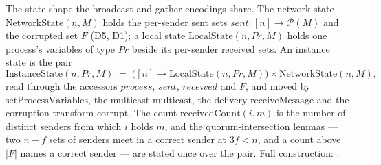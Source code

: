 \begin{definition}
  \label{def:aba-networkstate}
  \leanok
  The state shape the broadcast and gather encodings share.
  The network state $\mathrm{NetworkState}(n, M)$ holds the per-sender sent sets $sent : [n] \to \mathcal{P}(M)$ and the corrupted set $F$ (D5, D1); a local state $\mathrm{LocalState}(n, Pr, M)$ holds one process's variables of type $Pr$ beside its per-sender received sets.
  An instance state is the pair
  \[
    \mathrm{InstanceState}(n, Pr, M) \;=\; \bigl([n] \to \mathrm{LocalState}(n, Pr, M)\bigr) \times \mathrm{NetworkState}(n, M),
  \]
  read through the accessors $\mathit{process}$, $\mathit{sent}$, $\mathit{received}$ and $F$, and moved by $\mathrm{setProcessVariables}$, the multicast $\mathrm{multicast}$, the delivery $\mathrm{receiveMessage}$ and the corruption transform $\mathrm{corrupt}$.
  The count $\mathrm{receivedCount}(i, m)$ is the number of distinct senders from which $i$ holds $m$, and the quorum-intersection lemmas --- two $n{-}f$ sets of senders meet in a correct sender at $3f < n$, and a count above $|F|$ names a correct sender --- are stated once over the pair.
  Full construction: .
\end{definition}
